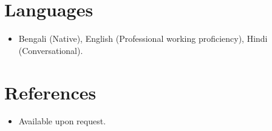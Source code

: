\documentclass[11pt,a4paper,sans]{moderncv}
\begin{document}
\section{Languages}
\vspace{1pt}
\begin{itemize}
\item {Bengali (Native), English (Professional working proficiency), Hindi (Conversational).}
\end{itemize}


\section{References}
\vspace{1pt}
\begin{itemize}
\item{Available upon request.}
\end{itemize}
\end{document}
